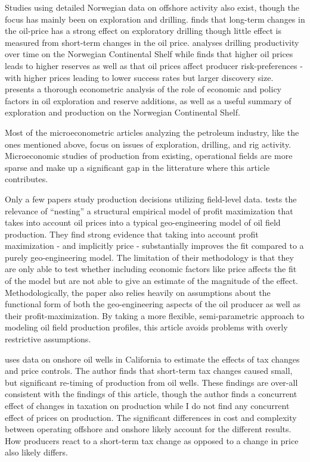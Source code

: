 \documentclass[12pt]{article}
\begin{document}
Studies using detailed Norwegian data on offshore activity also exist, though the focus has mainly been on exploration and drilling.  \citet{mohn_exploration_2008} finds that long-term changes in the oil-price has a strong effect on exploratory drilling though little effect is measured from short-term changes in the oil price. \citet{osmundsen_exploration_2010} analyses drilling productivity over time on the Norwegian Continental Shelf while \citet{mohn_efforts_2008} finds that higher oil prices leads to higher reserves as well as that oil prices affect producer risk-preferences - with higher prices leading to lower success rates but larger discovery size. \citet{mohn_elastic_2010} presents a thorough econometric analysis of the role of economic and policy factors in oil exploration and reserve additions, as well as a useful summary of exploration and production on the Norwegian Continental Shelf.

Most of the microeconometric articles analyzing the petroleum industry, like the ones mentioned above, focus on issues of exploration, drilling, and rig activity. Microeconomic studies of production from existing, operational fields are more sparse and make up a significant gap in the litterature where this article contributes.

Only a few papers study production decisions utilizing field-level data.  \citet{black_is_1998} tests the relevance of “nesting” a structural empirical model of profit maximization that takes into account oil prices into a typical geo-engineering model of oil field production.  They find strong evidence that taking into account profit maximization - and implicitly price - substantially improves the fit compared to a purely geo-engineering model. The limitation of their methodology is that they are only able to test whether including economic factors like price affects the fit of the model but are not able to give an estimate of the magnitude of the effect. Methodologically, the paper also relies heavily on assumptions about the functional form of both the geo-engineering aspects of the oil producer as well as their profit-maximization.  By taking a more flexible, semi-parametric approach to modeling oil field production profiles, this article avoids problems with overly restrictive assumptions. 

\citet{rao_taxation_2010} uses data on onshore oil wells in California to estimate the effects of tax changes and price controls. The author finds that short-term tax changes caused small, but significant re-timing of production from oil wells.  These findings are over-all consistent with the findings of this article, though the author finds a concurrent effect of changes in taxation on production while I do not find any concurrent effect of prices on production. The significant differences in cost and complexity between operating offshore and onshore likely account for the different results.  How producers react to a short-term tax change as opposed to a change in price also likely differs.
\end{document}
